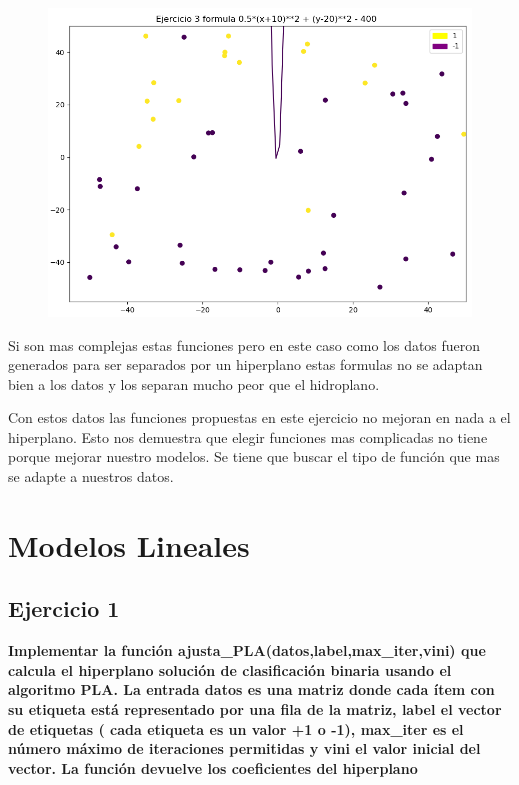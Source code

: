 \documentclass[titlepage]{article}
\begin{document}
	\begin{figure}[H]
		\centering
		\includegraphics[width=0.7\linewidth]{screenshot009}
		\caption{}
		\label{fig:screenshot009}
	\end{figure}
	Si son mas complejas estas funciones pero 
	en este caso como los datos fueron generados para ser separados por un hiperplano estas formulas no se adaptan bien a los datos y los separan mucho peor que el hidroplano. 
	\newline
	
	Con estos datos las funciones propuestas en este ejercicio no mejoran en nada a el hiperplano. Esto nos demuestra que elegir funciones mas complicadas no tiene porque mejorar nuestro modelos. Se tiene que buscar el tipo de función que mas se adapte a nuestros datos.
	
	\newpage
	
	\section{Modelos Lineales}
	\subsection{Ejercicio 1}
	\textbf{Implementar la función ajusta\_PLA(datos,label,max\_iter,vini) que calcula el hiperplano solución de clasificación binaria usando el algoritmo PLA. La entrada datos es una matriz donde cada ítem con su etiqueta está representado por una fila de la matriz, label el vector de etiquetas ( cada etiqueta es un valor +1 o -1), max\_iter es el número máximo de iteraciones permitidas y vini el valor inicial del vector. La función devuelve los coeficientes del hiperplano}
	
\end{document}
